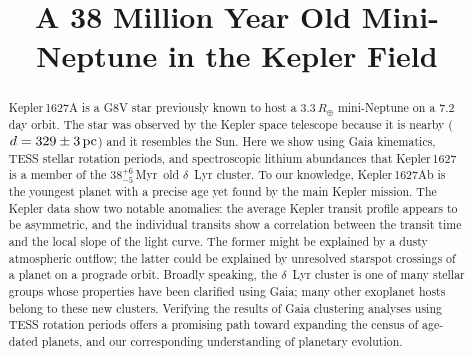 \documentclass[12pt,modern,twocolumn,tighten]{aastex63}
\newcommand{\clusterage}{$38^{+6}_{-5}$\,Myr} %
\begin{document}
\title{
  A 38 Million Year Old Mini-Neptune in the Kepler Field
}

\NewPageAfterKeywords


\begin{abstract}
  Kepler\,1627A is a G8V star previously known to host a
  $3.3\,R_\oplus$ mini-Neptune on a 7.2\,day orbit.  The star was
  observed by the Kepler space telescope because it is nearby
  ($d=329\pm3\,{\rm pc}$) and it resembles the Sun.  Here we show
  using Gaia kinematics, TESS stellar rotation periods, and
  spectroscopic lithium abundances that Kepler\,1627 is a member of
  the \clusterage\ old $\delta$~Lyr cluster.  To our knowledge,
  Kepler\,1627Ab is the youngest planet with a precise age yet found
  by the main Kepler mission.  The Kepler data show two notable
  anomalies: the average Kepler transit profile appears to be
  asymmetric, and the individual transits show a correlation between
  the transit time and the local slope of the light curve.  The former
  might be explained by a dusty atmospheric outflow; the latter could
  be explained by unresolved starspot crossings of a planet on a
  prograde orbit.  Broadly speaking, the $\delta$~Lyr cluster is one
  of many stellar groups whose properties have been clarified using
  Gaia; many other exoplanet hosts belong to these new clusters.
  Verifying the results of Gaia clustering analyses using TESS
  rotation periods offers a promising path toward expanding the census
  of age-dated planets, and our corresponding understanding of
  planetary evolution.

\end{abstract}
\end{document}
